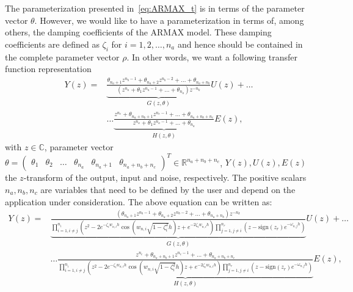 \documentclass{article}
\begin{document}
The parameterization presented in~\eqref{eq:ARMAX_t} is in terms of the parameter vector $\theta$. However, we would like to have a parameterization in terms of, among others, the damping coefficients of the ARMAX model. These damping coefficients are defined as $\zeta_i$ for $i=1,2,\ldots,n_a$ and hence should be contained in the complete parameter vector $\rho$. In other words, we want a following transfer function representation
\begin{equation}
\begin{aligned}
Y(z) = &\underbrace{\frac{  \theta_{n_a+1} z^{n_b-1} + \theta_{n_a+2} z^{n_b-2} + \dots + \theta_{n_a+n_b}}{(z^{n_a} + \theta_1 z^{n_a-1} + \dots + \theta_{n_a} )z^{-n_k} }}_{G(z,\theta)} U(z) + \ldots \\
&\ldots \underbrace{\frac{ z^{n_c} + \theta_{n_a+n_b+1}  z^{n_c-1} + \dots + \theta_{n_a+n_b+n_c} }{z^{n_a} + \theta_1 z^{n_a-1} + \dots + \theta_{n_a}}}_{H(z,\theta)} E(z),
\label{eq:ARMAX_z_theta}
\end{aligned}
\end{equation}
with $z \in \mathbb{C}$, parameter vector $\theta = \begin{pmatrix} \theta_1 & \theta_2 & \dots & \theta_{n_a} & \theta_{n_a+1} & \theta_{n_a+n_b+n_c} \end{pmatrix}^T \in \mathbb{R}^{n_a+n_b+n_c}$, $Y(z),U(z),E(z)$ the $z$-transform of the output, input and noise, respectively. The positive scalars $n_a,n_b,n_c$ are variables that need to be defined by the user and depend on the application under consideration. The above equation can be written as:
\begin{equation}
\begin{aligned}
Y(z) = &\underbrace{\frac{  (\theta_{n_a+1} z^{n_b-1} + \theta_{n_a+2} z^{n_b-2} + \dots + \theta_{n_a+n_b})z^{-n_k}}{   \prod_{i=1, i \neq j}^{n_i} \left( z^2 - 2 e^{-\zeta_i w_{n,i} h } \cos (w_{n,i} \sqrt{1-\zeta_i^2} h) z + e^{-2 \zeta_i w_{n,i} h}  \right)  \prod_{j=1, j \neq i}^{n_r} \left(  z-\text{sign}(z_r)e^{-\omega_{n,j}h} \right) }}_{G(z,\theta)} U(z) + \ldots \\
&\ldots \underbrace{\frac{ z^{n_c} + \theta_{n_a+n_b+1}  z^{n_c-1} + \dots + \theta_{n_a+n_b+n_c} }{       \prod_{i=1, i \neq j}^{n_i} \left( z^2 - 2 e^{-\zeta_i w_{n,i} h } \cos (w_{n,i} \sqrt{1-\zeta_i^2} h) z + e^{-2 \zeta_i w_{n,i} h}  \right)  \prod_{j=1, j \neq i}^{n_r} \left(  z-\text{sign}(z_r)e^{-\omega_{n,j}h} \right)      }}_{H(z,\theta)} E(z),
\label{eq:ARMAX_z_zeta}
\end{aligned}
\end{equation}
\end{document}
